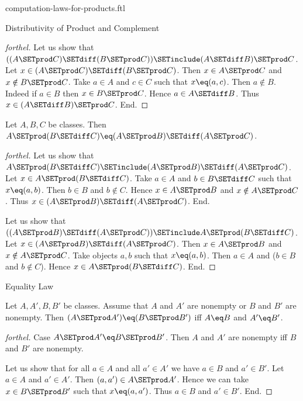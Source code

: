 \documentclass{naproche-library}
\begin{document}
\begin{smodule}[title=Computation Laws for Cartesian Products]{computation-laws-for-products.ftl}
\begin{sfragment}{Distributivity of Product and Complement}
\begin{proof}[forthel]
    Let us show that $((A \SETprod C) \SETdiff (B \SETprod C)) \SETinclude (A \SETdiff B) \SETprod C$. %
      Let $x \in (A \SETprod C) \SETdiff (B \SETprod C)$.
      Then $x \in A \SETprod C$ and $x \notin B \SETprod C$.
      Take $a \in A$ and $c \in C$ such that $x \eq (a, c)$.
      Then $a \notin B$.
      Indeed if $a \in B$ then $x \in B \SETprod C$.
      Hence $a \in A \SETdiff B$.
      Thus $x \in (A \SETdiff B) \SETprod C$.
    End.
  \end{proof}

  \begin{proposition}[forthel,id=FOUNDATIONS_05_3195639422779392]
    Let $A, B, C$ be classes.
    Then $A \SETprod (B \SETdiff C) \eq (A \SETprod B) \SETdiff (A \SETprod C)$.
  \end{proposition}
  \begin{proof}[forthel]
    Let us show that $A \SETprod (B \SETdiff C) \SETinclude (A \SETprod B) \SETdiff (A \SETprod C)$.
      Let $x \in A \SETprod (B \SETdiff C)$.
      Take $a \in A$ and $b \in B \SETdiff C$ such that $x \eq (a, b)$.
      Then $b \in B$ and $b \notin C$.
      Hence $x \in A \SETprod B$ and $x \notin A \SETprod C$.
      Thus $x \in (A \SETprod B) \SETdiff (A \SETprod C)$.
    End.

    Let us show that $((A \SETprod B) \SETdiff (A \SETprod C)) \SETinclude A \SETprod (B \SETdiff C)$. %
      Let $x \in (A \SETprod B) \SETdiff (A \SETprod C)$.
      Then $x \in A \SETprod B$ and $x \notin A \SETprod C$.
      Take objects $a, b$ such that $x \eq (a, b)$.
      Then $a \in A$ and ($b \in B$ and $b \notin C$).
      Hence $x \in A \SETprod (B \SETdiff C)$.
    End.
  \end{proof}
\end{sfragment}

\begin{sfragment}{Equality Law}
  \begin{proposition}[forthel,id=FOUNDATIONS_05_2677218429894656]
    Let $A, A', B, B'$ be classes.
    Assume that $A$ and $A'$ are nonempty or $B$ and $B'$ are nonempty.
    Then $(A \SETprod A') \eq (B \SETprod B')$ iff $A \eq B$ and $A' \eq B'$.
  \end{proposition}
  \begin{proof}[forthel]
    Case $A \SETprod A' \eq B \SETprod B'$.
      Then $A$ and $A'$ are nonempty iff $B$ and $B'$ are nonempty.

      Let us show that for all $a \in A$ and all $a' \in A'$ we have $a \in B$ and $a' \in B'$.
        Let $a \in A$ and $a' \in A'$.
        Then $(a, a') \in A \SETprod A'$.
        Hence we can take $x \in B \SETprod B'$ such that $x \eq (a, a')$.
        Thus $a \in B$ and $a' \in B'$.
      End.


\end{proof}
\end{sfragment}
\end{smodule}
\end{document}

